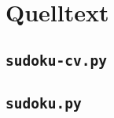 \section{Quelltext}

\subsection{\texttt{sudoku-cv.py}}


\newpage

\subsection{\texttt{sudoku.py}}

